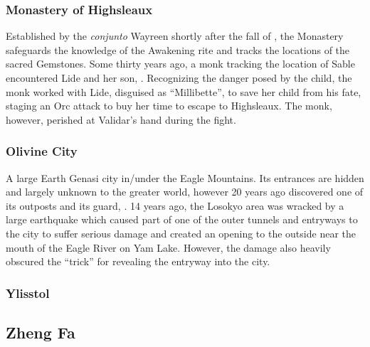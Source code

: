 \subsubsection{Monastery of Highsleaux}
\label{places:highsleaux}
Established by the \textit{conjunto} Wayreen shortly after the fall of , the Monastery safeguards the knowledge of the Awakening rite and tracks the locations of the sacred Gemstones. Some thirty years ago, a monk tracking the location of Sable encountered Lide and her son, . Recognizing the danger posed by the child, the monk worked with Lide, disguised as ``Millibette'', to save her child from his fate, staging an Orc attack to buy her time to escape to Highsleaux. The monk, however, perished at Validar's hand during the fight.

\subsubsection{Olivine City}
\label{places:olivine}
A large Earth Genasi city in/under the Eagle Mountains. Its entrances are hidden and largely unknown to the greater world, however 20 years ago  discovered one of its outposts and its guard, . 14 years ago, the Losokyo area was wracked by a large earthquake which caused part of one of the outer tunnels and entryways to the city to suffer serious damage and created an opening to the outside near the mouth of the Eagle River on Yam Lake. However, the damage also heavily obscured the ``trick'' for revealing the entryway into the city.

\subsubsection{Ylisstol}
\label{places:ylisstol}

\subsection{Zheng Fa}
\label{nations:zhengfa}